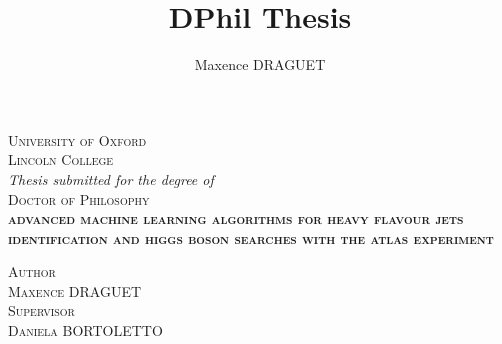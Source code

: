 \documentclass[11pt,a4paper]{report}
\author{Maxence DRAGUET}
\title{DPhil Thesis}
\begin{document}
\AddToShipoutPicture*{\BackgroundPic}
\begin{titlepage}

 
\newcommand{\HRule}{\rule{\linewidth}{0.5mm}}
\center 
\vspace*{4cm}
\textsc{\LARGE \color{white} University of Oxford}\\
\textsc{\large \color{white} Lincoln College}\\[1cm]
\textit{\large \color{white} Thesis submitted for the degree of} \\
\textsc{\Large \color{white} Doctor of Philosophy}\\[2cm]

\textsc{\huge \bfseries \color{white} advanced machine learning algorithms for heavy flavour jets identification and higgs boson searches with the atlas experiment}\\[0.4cm] 
\vfil
\color{white}
    \begin{minipage}{0.4\textwidth}
    \begin{center}
    \textsc{Author\\[0.2cm]
    \Large Maxence DRAGUET}\\[0.3cm]
    \textsc{Supervisor\\[0.2cm]
    \Large Daniela BORTOLETTO}\\
		
    \end{center}
    \end{minipage}


\end{titlepage}
\end{document}
